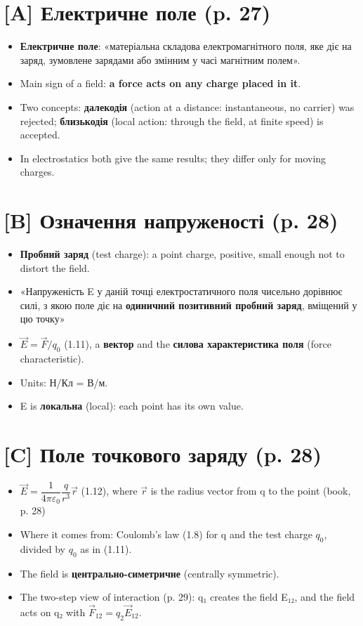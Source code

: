 \documentclass[11pt,a4paper,oneside]{book}
\begin{document}
\section*{[A] Електричне поле (p. 27)}
\begin{itemize}
\item \textbf{Електричне поле}: «матеріальна складова електромагнітного поля, яке діє на заряд, зумовлене зарядами або змінним у часі магнітним полем».
\item Main sign of a field: \textbf{a force acts on any charge placed in it}.
\item Two concepts: \textbf{далекодія} (action at a distance: instantaneous, no carrier) was rejected; \textbf{близькодія} (local action: through the field, at finite speed) is accepted.
\item In electrostatics both give the same results; they differ only for moving charges.
\end{itemize}

\section*{[B] Означення напруженості (p. 28)}
\begin{itemize}
\item \textbf{Пробний заряд} (test charge): a point charge, positive, small enough not to distort the field.
\item «Напруженість E у даній точці електростатичного поля чисельно дорівнює силі, з якою поле діє на \textbf{одиничний позитивний пробний заряд}, вміщений у цю точку»
\item $\vec E = \vec F / q_0$ (1.11), a \textbf{вектор} and the \textbf{силова характеристика поля} (force characteristic).
\item Units: Н/Кл = В/м.
\item E is \textbf{локальна} (local): each point has its own value.
\end{itemize}

\section*{[C] Поле точкового заряду (p. 28)}
\begin{itemize}
\item $\vec E = \dfrac{1}{4\pi\varepsilon_0}\dfrac{q}{r^3}\vec r$ (1.12), where $\vec r$ is the radius vector from q to the point (book, p. 28)
\item Where it comes from: Coulomb's law (1.8) for q and the test charge $q_0$, divided by $q_0$ as in (1.11).
\item The field is \textbf{центрально-симетричне} (centrally symmetric).
\item The two-step view of interaction (p. 29): q₁ creates the field E₁₂, and the field acts on q₂ with $\vec F_{12} = q_2\vec E_{12}$.
\end{itemize}
\end{document}
